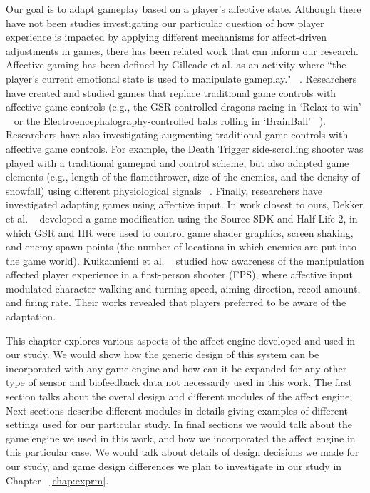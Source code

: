 
Our goal is to adapt gameplay based on a player's affective state. Although there have not been studies investigating our particular question of how player experience is impacted by applying different mechanisms for affect-driven adjustments in games, there has been related work that can inform our research. Affective gaming has been defined by Gilleade et al. as an activity where ``the player's current emotional state is used to manipulate gameplay." ~\cite{gilleade2005affective}. Researchers have created and studied games that replace traditional game controls with affective game controls (e.g., the GSR-controlled dragons racing in `Relax-to-win' ~\cite{bersak2001intelligent} or the Electroencephalography-controlled balls rolling in `BrainBall' ~\cite{hjelm2003research}). Researchers have also investigating augmenting traditional game controls with affective game controls. For example, the Death Trigger side-scrolling shooter was played with a traditional gamepad and control scheme, but also adapted game elements (e.g., length of the flamethrower, size of the enemies, and the density of snowfall) using different physiological signals ~\cite{nacke2011biofeedback}. Finally, researchers have investigated adapting games using affective input. In work closest to ours, Dekker et al. ~\cite{dekker2007please} developed a game modification using the Source SDK and Half-Life 2, in which GSR and HR were used to control game shader graphics, screen shaking, and enemy spawn points (the number of locations in which enemies are put into the game world).  Kuikanniemi et al. ~\cite{kuikkaniemi2010influence} studied how awareness of the manipulation affected player experience in a first-person shooter (FPS), where affective input modulated character walking and turning speed, aiming direction, recoil amount, and firing rate. Their works revealed that players preferred to be aware of the adaptation.

This chapter explores various aspects of the affect engine developed and used in our study. We would show how the generic design of this system can be incorporated with any game engine and how can it be expanded for any other type of sensor and biofeedback data not necessarily used in this work. The first section talks about the overal design and different modules of the affect engine; Next sections describe different modules in details giving examples of different settings used for our particular study. In final sections we would talk about the game engine we used in this work, and how we incorporated the affect engine in this particular case. We would talk about details of design decisions we made for our study, and game design differences we plan to investigate in our study in Chapter ~\ref{chap:exprm}.

